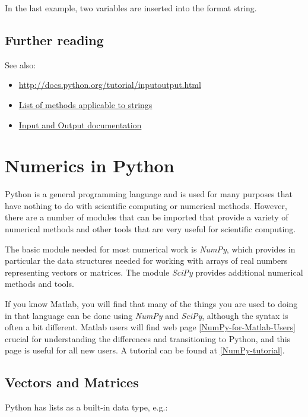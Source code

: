 \documentclass[letterpaper,10pt,english]{sphinxmanual}
\begin{document}
In the last example, two variables are inserted into the format string.


\subsection{Further reading}
\label{python_strings:further-reading}
See  also:
\begin{itemize}
\item {} 
\href{http://docs.python.org/tutorial/inputoutput.html}{http://docs.python.org/tutorial/inputoutput.html}

\item {} 
\href{http://docs.python.org/release/2.5.2/lib/string-methods.html}{List of methods applicable to strings}

\item {} 
\href{http://docs.python.org/2/tutorial/inputoutput.html}{Input and Output documentation}

\end{itemize}


\section{Numerics in Python}
\label{numerical_python:numerical-python}\label{numerical_python::doc}\label{numerical_python:numerics-in-python}
Python is a general programming language and is used for many purposes that have
nothing to do with scientific computing or numerical methods.  However,
there are a number of modules that can be imported that provide a variety of
numerical methods and other tools that are very useful for scientific
computing.

The basic module needed for most numerical work is \emph{NumPy}, which provides in
particular the data structures needed for working with
arrays of real numbers representing vectors or matrices.  The module \emph{SciPy}
provides additional numerical methods and tools.

If you know Matlab, you will find that many of the things you are used to
doing in that language can be done using \emph{NumPy} and \emph{SciPy}, although the
syntax is often a bit different.  Matlab users will find web page
{\hyperref[biblio:numpy-for-matlab-users]{{[}NumPy-for-Matlab-Users{]}}} crucial for understanding the differences and
transitioning to Python, and this page is useful for all new users.  A
tutorial can be found at {\hyperref[biblio:numpy-tutorial]{{[}NumPy-tutorial{]}}}.


\subsection{Vectors and Matrices}
\label{numerical_python:vectors-and-matrices}
Python has lists as a built-in data type, e.g.:
\end{document}
